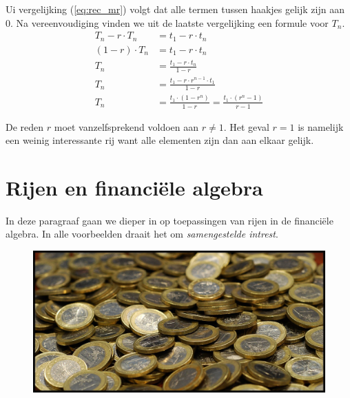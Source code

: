 Ui vergelijking (\ref{eq:rec_mr}) volgt dat alle termen tussen haakjes gelijk zijn aan 0. Na vereenvoudiging vinden we uit de
laatste vergelijking een formule voor $T_{n}$.
\begin{align*}
    T_{n}-r\cdot T_{n} &= t_{1}-r\cdot t_{n}  \\
    (1-r)\cdot T_{n} &=  t_{1}-r\cdot t_{n} \\
    T_{n} &= \frac{t_{1}-r\cdot t_{n}}{1-r}  \\
    T_{n} &= \frac{t_{1}-r\cdot r^{n-1} \cdot t_{1}}{1-r}\\
    T_{n} &= \frac{t_{1}\cdot (1-r^{n})}{1-r}=\frac{t_{1}\cdot
    (r^{n}-1)}{r-1}
\end{align*}


De reden $r$ moet vanzelfsprekend voldoen aan $r\neq 1$. Het geval $r=1$ is namelijk een weinig interessante rij
want alle elementen zijn dan aan elkaar gelijk. 


\section{Rijen en financi\"{e}le algebra}
In deze paragraaf gaan we dieper in op toepassingen van rijen in de
financi\"{e}le algebra. In alle voorbeelden draait het om \textit{samengestelde intrest}.
\begin{figure}[h]
\begin{center}
\includegraphics[trim=0.2cm 1.5cm 0.2cm 1.5cm,clip,width=\textwidth]{figuren/rijen/geldstukken.jpg}
\end{center}
\end{figure}



